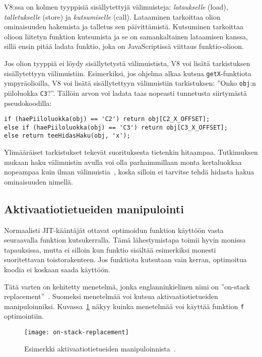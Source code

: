 V8:ssa on kolmen tyyppisiä sisällytettyjä välimuisteja: \textit{lataukselle} (load), \textit{talletukselle} (store) ja \textit{kutsumiselle} (call). Lataaminen tarkoittaa olion ominaisuuden hakemista ja talletus sen päivittämistä. Kutsuminen tarkoittaa olioon liitetyn funktion kutsumista ja se on samankaltainen lataamisen kanssa, sillä ensin pitää ladata funktio, joka on JavaScriptissä viittaus funktio-olioon.

Jos olion tyyppiä ei löydy sisällytetystä välimuistista, V8 voi lisätä tarkistuksen sisällytettyyn välimuistiin. Esimerkiksi, jos ohjelma alkaa kutsua \texttt{getX}-funktiota ympyräolioilla, V8 voi lisätä sisällytettyyn välimuistiin tarkistuksen: ''Onko \texttt{obj}:n piiloluokka \texttt{C3}?''. Tällöin arvon voi ladata taas nopeasti tunnetusta siirtymästä pseudokoodilla:
\begin{lstlisting}
if (haePiiloluokka(obj) == 'C2') return obj[C2_X_OFFSET];
else if (haePiiloluokka(obj) == 'C3') return obj[C3_X_OFFSET];
else return teeHidasHaku(obj, 'x');
\end{lstlisting}

Ylimääräiset tarkistukset tekevät suorituksesta tietenkin hitaampaa. Tutkimuksen mukaan haku välimuistin avulla voi olla parhaimmillaan monta kertaluokkaa nopeampaa kuin ilman välimuistia~\cite[s.~498]{Ahn2014}, koska silloin ei tarvitse tehdä hidasta hakua ominaisuuden nimellä.

\subsection{Aktivaatiotietueiden manipulointi}

Normaalisti JIT-kääntäjät ottavat optimoidun funktion käyttöön vasta seuraavalla funktion kutsukerralla. Tämä lähestymistapa toimii hyvin monissa tapauksissa, mutta ei silloin kun funktio sisältää esimerkiksi monesti suoritettavan toistorakenteen. Jos funktiota kutsutaan vain kerran, optimoitua koodia ei koskaan saada käyttöön.

Tätä varten on kehitetty menetelmä, jonka englanninkielinen nimi on ''on-stack replacement''~\cite{osr}. Suomeksi menetelmää voi kutsua aktivaatiotietueiden manipuloinniksi. Kuvassa~\ref{fig:osr} näkyy kuinka menetelmää voi käyttää funktion \texttt{f} optimointiin.

\begin{figure}[ht]
    \texttt{[image: on-stack-replacement]}
    \caption{Esimerkki aktivaatiotietueiden manipuloinnista~\cite{osrpic}.}
     \centering
     \label{fig:osr}
\end{figure}

